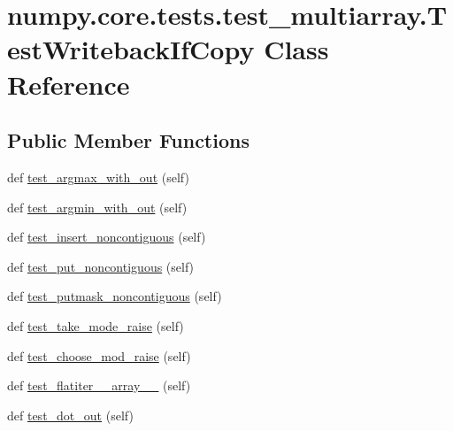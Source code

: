 \hypertarget{classnumpy_1_1core_1_1tests_1_1test__multiarray_1_1TestWritebackIfCopy}{}\section{numpy.\+core.\+tests.\+test\+\_\+multiarray.\+Test\+Writeback\+If\+Copy Class Reference}
\label{classnumpy_1_1core_1_1tests_1_1test__multiarray_1_1TestWritebackIfCopy}
\subsection*{Public Member Functions}
\begin{DoxyCompactItemize}
\item 
def \hyperlink{classnumpy_1_1core_1_1tests_1_1test__multiarray_1_1TestWritebackIfCopy_adf64dce2d0f074db7cec81e4cb71d824}{test\+\_\+argmax\+\_\+with\+\_\+out} (self)
\item 
def \hyperlink{classnumpy_1_1core_1_1tests_1_1test__multiarray_1_1TestWritebackIfCopy_a817669caa0f73c286b2ed2ee7b5ee2f5}{test\+\_\+argmin\+\_\+with\+\_\+out} (self)
\item 
def \hyperlink{classnumpy_1_1core_1_1tests_1_1test__multiarray_1_1TestWritebackIfCopy_a6788235f26b54d3342881d70ec29dbf2}{test\+\_\+insert\+\_\+noncontiguous} (self)
\item 
def \hyperlink{classnumpy_1_1core_1_1tests_1_1test__multiarray_1_1TestWritebackIfCopy_a2b2d0f3cf838f76f268b9467128e1ae5}{test\+\_\+put\+\_\+noncontiguous} (self)
\item 
def \hyperlink{classnumpy_1_1core_1_1tests_1_1test__multiarray_1_1TestWritebackIfCopy_a9255e4e48a9c0cf2d21731e0f1fe233e}{test\+\_\+putmask\+\_\+noncontiguous} (self)
\item 
def \hyperlink{classnumpy_1_1core_1_1tests_1_1test__multiarray_1_1TestWritebackIfCopy_ae4200d7ff8a34d02c1dee34fa3f3cdd1}{test\+\_\+take\+\_\+mode\+\_\+raise} (self)
\item 
def \hyperlink{classnumpy_1_1core_1_1tests_1_1test__multiarray_1_1TestWritebackIfCopy_a75889577f875dfe69b350ddf4a89b68c}{test\+\_\+choose\+\_\+mod\+\_\+raise} (self)
\item 
def \hyperlink{classnumpy_1_1core_1_1tests_1_1test__multiarray_1_1TestWritebackIfCopy_a3368e8cba1648bc066cf118f740ad444}{test\+\_\+flatiter\+\_\+\+\_\+array\+\_\+\+\_\+} (self)
\item 
def \hyperlink{classnumpy_1_1core_1_1tests_1_1test__multiarray_1_1TestWritebackIfCopy_a313e8bcdbee8f3ba8ba4661764cbf47f}{test\+\_\+dot\+\_\+out} (self)

\end{DoxyCompactItemize}
